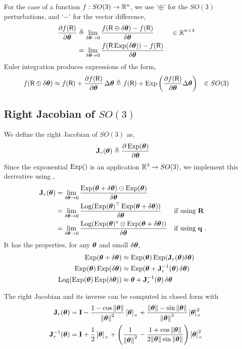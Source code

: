 For the case of a function $f: SO(3)\to\bbR^n$, we use `$\oplus$' for the $SO(3)$ perturbations, and `$-$' for the vector difference,
%
\begin{align}
\dpar{f(\sR)}{\bth} &\te \lim_{\delta\bth\to0} \frac{f(\sR\oplus\delta\bth) - f(\sR)}{\delta\bth} && \in \bbR^{n\times 3} \label{equ:jacobian_SO3_Rn}\\
&= \lim_{\delta\bth\to0} \frac{f(\sR\Exp(\delta\bth)) - f(\sR)}{\delta\bth}
\end{align}
%
Euler integration produces expressions of the form,
%
\begin{align*}
f(\sR\oplus\delta\bth) &\approx f(\sR)+\dpar{f(\sR)}{\bth}\,\Delta\bth
 \te f(\sR)+\Exp\left(\dpar{f(\sR)}{\bth}\Delta\bth\right)
 & \in SO(3)
\end{align*}


\subsection{Right Jacobian of $SO(3)$ }

We define the right Jacobian of $SO(3)$ as, 
%
\begin{align}
\bfJ_r(\bth) &\te \dpar{\Exp(\bth)}{\bth} 
\end{align}
%
Since the exponential $\Exp()$ is an application $\bbR^3\to SO(3)$,
we implement this derivative using ,
%
\begin{align}
\bfJ_r(\bth) &= \lim_{\dth\to0}\frac{\Exp(\bth+\dth)\ominus\Exp(\bth)}{\dth} \\
 &= \lim_{\dth\to0}\frac{\Log(\Exp(\bth)\tr\Exp(\bth+\dth))}{\dth} && \textrm{if using $\bfR$} \\
 &= \lim_{\dth\to0}\frac{\Log(\Exp(\bth)^*\ot\Exp(\bth+\dth))}{\dth} && \textrm{if using $\bfq$} 
 ~.
\end{align}
%
It has the properties, for any $\bth$ and small $\dth$,
%
\begin{align}
\Exp(\bth+\dth) &\approx \Exp(\bth)\Exp(\bfJ_r(\bth)\dth) \\
\Exp(\bth)\Exp(\dth) &\approx \Exp(\bth+\bfJ_r\inv(\bth)\,\dth) \\
\Log(\Exp(\bth)\Exp(\dth)) &\approx \bth+\bfJ_r\inv(\bth)\,\dth 
\end{align}

The right Jacobian and its inverse can be computed in closed form with
%
\begin{align}
\bfJ_r(\bth) &= \bfI - \frac{1-\cos\nth}{\nth^2}\hatx{\bth} + \frac{\nth-\sin\nth}{\nth^3}\hatx{\bth}^2 \\
\bfJ_r\inv(\bth) &= \bfI + \frac12\hatx{\bth} + \left(\frac1{\nth^2} - \frac{1+\cos\nth}{2\nth\sin\nth}\right)\hatx{\bth}^2
\end{align}






